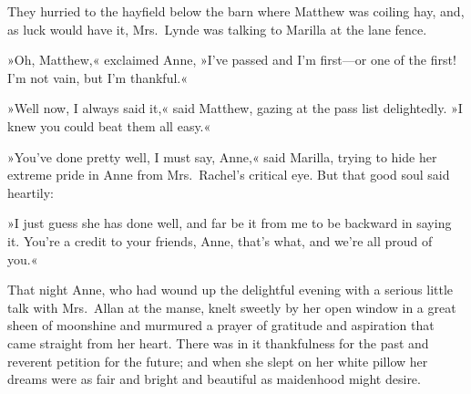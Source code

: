 They hurried to the hayfield below the barn where Matthew was coiling hay, and, as luck would have it, Mrs.~Lynde was talking to Marilla at the lane fence.

»Oh, Matthew,« exclaimed Anne, »I've passed and I'm first—or one of the first! I'm not vain, but I'm thankful.«

»Well now, I always said it,« said Matthew, gazing at the pass list delightedly. »I knew you could beat them all easy.«

»You've done pretty well, I must say, Anne,« said Marilla, trying to hide her extreme pride in Anne from Mrs.~Rachel's critical eye. But that good soul said heartily:

»I just guess she has done well, and far be it from me to be backward in saying it. You're a credit to your friends, Anne, that's what, and we're all proud of you.«

That night Anne, who had wound up the delightful evening with a serious little talk with Mrs.~Allan at the manse, knelt sweetly by her open window in a great sheen of moonshine and murmured a prayer of gratitude and aspiration that came straight from her heart. There was in it thankfulness for the past and reverent petition for the future; and when she slept on her white pillow her dreams were as fair and bright and beautiful as maidenhood might desire.